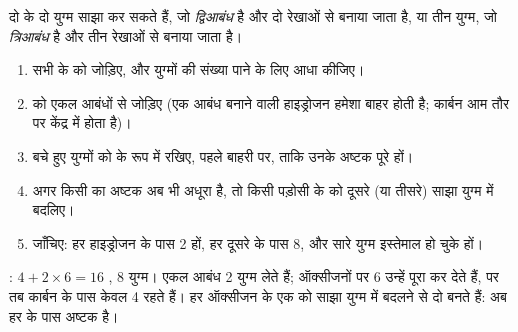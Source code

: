 \begin{definition}[द्विआबंध और त्रिआबंध]\label{def:g10:lewis-and-shape:multiple-bond}
दो   के दो युग्म साझा कर सकते हैं, जो \emph{द्विआबंध}
है और दो रेखाओं से बनाया जाता है, या तीन युग्म, जो
\emph{त्रिआबंध} है और तीन रेखाओं से बनाया जाता है।
\end{definition}

\begin{method}[लुइस संरचना बनाना]\label{met:g10:lewis-and-shape:draw}
\begin{enumerate}
  \item सभी  के  को जोड़िए, और युग्मों की संख्या
        पाने के लिए आधा कीजिए।
  \item {} को एकल आबंधों से जोड़िए (एक आबंध बनाने वाली हाइड्रोजन
        हमेशा बाहर होती है; कार्बन आम तौर पर केंद्र में होता है)।
  \item बचे हुए युग्मों को  के रूप में रखिए, पहले बाहरी 
        पर, ताकि उनके अष्टक पूरे हों।
  \item अगर किसी  का अष्टक अब भी अधूरा है, तो किसी पड़ोसी के 
        को दूसरे (या तीसरे) साझा युग्म में बदलिए।
  \item जाँचिए: हर हाइड्रोजन के पास 2  हों, हर दूसरे  के पास 8,
        और सारे युग्म इस्तेमाल हो चुके हों।
\end{enumerate}
\end{method}

\begin{example}[कार्बन डाइऑक्साइड]\label{ex:g10:lewis-and-shape:co2}
: $4 + 2 \times 6 = 16$ , 8 युग्म। एकल आबंध
 2 युग्म लेते हैं; ऑक्सीजनों पर 6  उन्हें पूरा कर देते हैं,
पर तब कार्बन के पास केवल 4  रहते हैं। हर ऑक्सीजन के एक  को
साझा युग्म में बदलने से दो  बनते हैं: अब हर  के पास अष्टक है।
\end{example}

